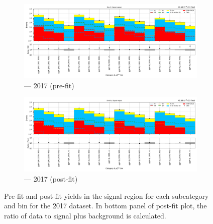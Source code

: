 \begin{figure}[htbp]
    \centering
    \begin{subfigure}[b]{0.9\textwidth}
        \includegraphics[width=\textwidth]{figures/mountain_ranges/2017/ggF/SR_tree_prefit-abs_values_ggF_cats.pdf}
        \caption{\ggH --- 2017 (pre-fit)}
    \end{subfigure}

    \begin{subfigure}[b]{0.9\textwidth}
        \includegraphics[width=\textwidth]{figures/mountain_ranges/2017/ggF/SR_tree_fit_s-abs_values_ggF_cats.pdf}
        \caption{\ggH --- 2017 (post-fit)}
    \end{subfigure}
    \caption[Pre-fit and post-fit yields in the signal region for each \ggH subcategory and \ptmiss bin for the 2017 dataset]{Pre-fit and post-fit yields in the signal region for each \ggH subcategory and \ptmiss bin for the 2017 dataset. In bottom panel of post-fit plot, the ratio of data to signal plus background is calculated.}
    \label{fig:htoinv_mountain_range_ggH_2017}
\end{figure}

